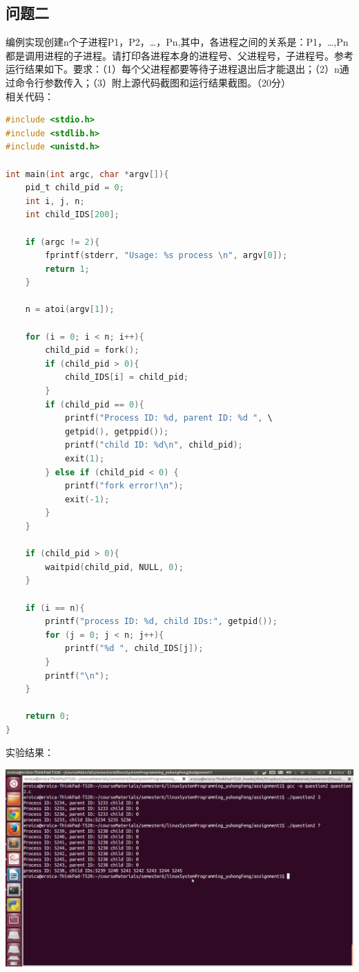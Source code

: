 \documentclass{article}
\begin{document}
\subsection{问题二}
编例实现创建n个子进程P1，P2，…，Pn,其中，各进程之间的关系是：P1，…,Pn都是调用进程的子进程。请打印各进程本身的进程号、父进程号，子进程号。参考运行结果如下。要求：（1）每个父进程都要等待子进程退出后才能退出；（2）n通过命令行参数传入；（3）附上源代码截图和运行结果截图。（20分） \\

相关代码：

\begin{lstlisting}[language=C]
#include <stdio.h>
#include <stdlib.h>
#include <unistd.h>

int main(int argc, char *argv[]){
	pid_t child_pid = 0;
	int i, j, n;
	int child_IDS[200];

	if (argc != 2){
		fprintf(stderr, "Usage: %s process \n", argv[0]);
		return 1;
	}

	n = atoi(argv[1]);

	for (i = 0; i < n; i++){
		child_pid = fork();
		if (child_pid > 0){
			child_IDS[i] = child_pid;
		}
		if (child_pid == 0){
			printf("Process ID: %d, parent ID: %d ", \
			getpid(), getppid());
			printf("child ID: %d\n", child_pid);
			exit(1);
		} else if (child_pid < 0) {
			printf("fork error!\n");
			exit(-1);
		}
	}

	if (child_pid > 0){
		waitpid(child_pid, NULL, 0);
	}

	if (i == n){
		printf("process ID: %d, child IDs:", getpid());
		for (j = 0; j < n; j++){
			printf("%d ", child_IDS[j]);
		}
		printf("\n");
	}

	return 0;
}
\end{lstlisting}

实验结果：

\begin{center}
\includegraphics[width=0.8\columnwidth]{pic_question2} %
\end{center}
\end{document}
